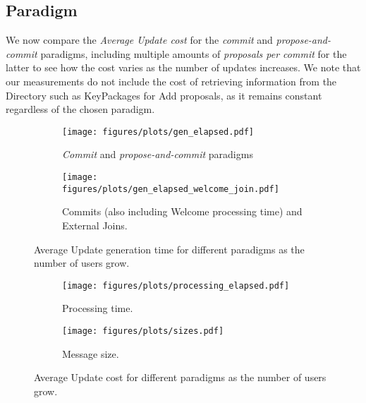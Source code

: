 \documentclass[preprint, 12pt]{elsarticle}
\begin{document}
\subsection{Paradigm}
\label{sec:paradigm}

We now compare the \textit{Average Update cost} for the \textit{commit} and \textit{propose-and-commit} paradigms, including multiple amounts of \textit{proposals per commit} for the latter to see how the cost varies as the number of updates increases. We note that our measurements do not include the cost of retrieving information from the Directory such as KeyPackages for Add proposals, as it remains constant regardless of the chosen paradigm. 

\begin{figure*}[t]
    \centering
    \begin{subfigure}{0.45\textwidth}
        \centering
        \texttt{[image: figures/plots/gen\_elapsed.pdf]}
        \caption{\textit{Commit} and \textit{propose-and-commit} paradigms}
        \label{fig:cpu_gen_para}
    \end{subfigure}
    \begin{subfigure}{0.45\textwidth}
        \centering
        \texttt{[image: figures/plots/gen\_elapsed\_welcome\_join.pdf]}
        \caption{Commits (also including Welcome processing time) and External Joins.}
        \label{fig:cpu_gen_join}
    \end{subfigure}
    \caption{Average Update generation time for different paradigms as the number of users grow.}
    \label{fig:cpu_gen}
\end{figure*}


\begin{figure*}[t]
    \centering
    \begin{subfigure}{0.45\textwidth}
        \centering
        \texttt{[image: figures/plots/processing\_elapsed.pdf]}
        \caption{Processing time.}
        \label{fig:cpu_proc}
    \end{subfigure}
    \begin{subfigure}{0.45\textwidth}
        \centering
        \texttt{[image: figures/plots/sizes.pdf]}
        \caption{Message size.}
        \label{fig:cpu_size}
    \end{subfigure}
    \caption{Average Update cost for different paradigms as the number of users grow.}
    \label{fig:cpu_cost}
\end{figure*}
\end{document}
